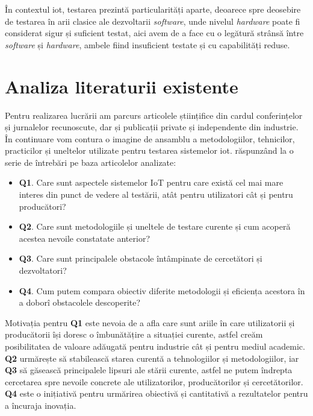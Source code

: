 
În contextul \acrshort{iot}, testarea prezintă particularități aparte, deoarece spre deosebire de testarea în arii clasice ale dezvoltarii \textit{software}, unde nivelul \textit{hardware} poate fi considerat sigur și suficient testat, aici avem de a face cu o legătură strânsă între \textit{software} și \textit{hardware}, ambele fiind insuficient testate și cu capabilități reduse.


\section{Analiza literaturii existente}

Pentru realizarea lucrării am parcurs articolele științifice din cardul conferințelor și jurnalelor recunoscute, dar și publicații private și independente din industrie. În continuare vom contura o imagine de ansamblu a metodologiilor, tehnicilor, practicilor și uneltelor utilizate pentru testarea sistemelor \acrshort{iot}. răspunzând la o serie de întrebări pe baza articolelor analizate: 

\begin{itemize}
    \item[] \textbf{Q1}. Care sunt aspectele sistemelor IoT pentru care există cel mai mare interes din punct de vedere al testării, atât pentru utilizatori cât și pentru producători?
    \item[] \textbf{Q2}. Care sunt metodologiile și uneltele de testare curente și cum acoperă acestea nevoile constatate anterior?
    \item[] \textbf{Q3}. Care sunt principalele obstacole întâmpinate de cercetători și dezvoltatori?
    \item[] \textbf{Q4}. Cum putem compara obiectiv diferite metodologii și eficiența acestora în a doborî obstacolele descoperite?
\end{itemize}

Motivația pentru \textbf{Q1} este nevoia de a afla care sunt ariile în care utilizatorii și producătorii își doresc o îmbunătățire a situației curente, astfel creăm posibilitatea de valoare adăugată pentru industrie cât și pentru mediul academic. \textbf{Q2} urmărește să stabilească starea curentă a tehnologiilor și metodologiilor, iar \textbf{Q3} să găsească principalele lipsuri ale stării curente, astfel ne putem îndrepta cercetarea spre nevoile concrete ale utilizatorilor, producătorilor și cercetătorilor. \textbf{Q4} este o inițiativă pentru urmărirea obiectivă și cantitativă a rezultatelor pentru a încuraja inovația.

